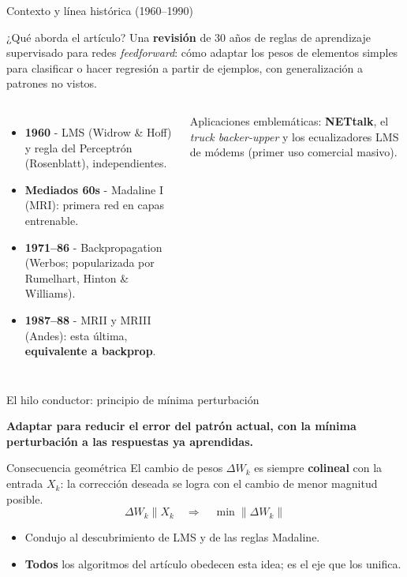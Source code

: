 \documentclass[aspectratio=169, 11pt, xcolor={dvipsnames,table}]{beamer}
\newcommand{\azul}[1]{\textcolor{UsachAzul}{#1}}
\newcommand{\naranja}[1]{\textcolor{UsachNaranja}{#1}}
\begin{document}
\begin{frame}{Contexto y línea histórica (1960--1990)}
\begin{block}{¿Qué aborda el artículo?}
Una \textbf{revisión} de 30 años de reglas de aprendizaje supervisado para redes
\emph{feedforward}: cómo \azul{adaptar los pesos} de elementos simples para clasificar o
hacer regresión a partir de ejemplos, con \naranja{generalización} a patrones no vistos.
\end{block}
\begin{columns}[T]
\begin{itemize}\footnotesize
  \item \textbf{1960} - \azul{LMS} (Widrow \& Hoff) y regla del \azul{Perceptrón} (Rosenblatt), independientes.
  \item \textbf{Mediados 60s} - \azul{Madaline I} (MRI): primera red en capas entrenable.
  \item \textbf{1971--86} - \azul{Backpropagation} (Werbos; popularizada por Rumelhart, Hinton \& Williams).
  \item \textbf{1987--88} - \azul{MRII} y \azul{MRIII} (Andes): esta última, \textbf{equivalente a backprop}.
\end{itemize}
\begin{tipbox}\footnotesize
Aplicaciones emblemáticas: \textbf{NETtalk}, el \emph{truck backer-upper} y los ecualizadores LMS de
módems (primer uso comercial masivo).
\end{tipbox}
\end{columns}
\end{frame}

\begin{frame}{El hilo conductor: principio de mínima perturbación}
\begin{ideaclave}
\textbf{Adaptar para reducir el error del patrón actual, con la mínima perturbación a las respuestas
ya aprendidas.}
\end{ideaclave}
\begin{block}{Consecuencia geométrica}
El cambio de pesos $\Delta W_k$ es siempre \textbf{colineal} con la entrada $X_k$: la corrección
deseada se logra con el cambio de \azul{menor magnitud posible}.
\[ \Delta W_k \parallel X_k \quad\Longrightarrow\quad \min \lVert \Delta W_k \rVert \]
\end{block}
\begin{itemize}\footnotesize
  \item Condujo al descubrimiento de LMS y de las reglas Madaline.
  \item \textbf{Todos} los algoritmos del artículo obedecen esta idea; es el eje que los unifica.
\end{itemize}
\end{frame}
\end{document}
